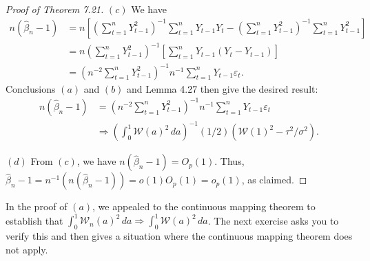 \begin{proof}[Proof of Theorem 7.21]
$(c)$ We have
\begin{align*}
n(\hat{\beta}_n - 1) &= n\left[\left(\sum_{t=1}^{n} Y_{t-1}^2\right)^{-1}\sum_{t=1}^{n} Y_{t-1}Y_t - \left(\sum_{t=1}^{n} Y_{t-1}^2\right)^{-1}\sum_{t=1}^{n} Y_{t-1}^2\right] \\
&= n\left(\sum_{t=1}^{n} Y_{t-1}^2\right)^{-1}\left[\sum_{t=1}^{n} Y_{t-1}(Y_t - Y_{t-1})\right] \\
&= \left(n^{-2}\sum_{t=1}^{n} Y_{t-1}^2\right)^{-1} n^{-1}\sum_{t=1}^{n} Y_{t-1}\varepsilon_t.
\end{align*}
Conclusions $(a)$ and $(b)$ and Lemma 4.27 then give the desired result:
\begin{align*}
n(\hat{\beta}_n - 1) &= \left(n^{-2}\sum_{t=1}^{n} Y_{t-1}^2\right)^{-1} n^{-1}\sum_{t=1}^{n} Y_{t-1}\varepsilon_t \\
&\Rightarrow \left(\int_0^1 \mathcal{W}(a)^2\,da\right)^{-1}(1/2)\left(\mathcal{W}(1)^2 - \tau^2/\sigma^2\right).
\end{align*}

$(d)$ From $(c)$, we have $n(\hat{\beta}_n - 1) = O_p(1)$. Thus, $\hat{\beta}_n - 1 = n^{-1}(n(\hat{\beta}_n - 1)) = o(1)O_p(1) = o_p(1)$, as claimed.
\end{proof}

In the proof of $(a)$, we appealed to the continuous mapping theorem to establish that $\int_0^1 \mathcal{W}_n(a)^2\,da \Rightarrow \int_0^1 \mathcal{W}(a)^2\,da$. The next exercise asks you to verify this and then gives a situation where the continuous mapping theorem does not apply.

